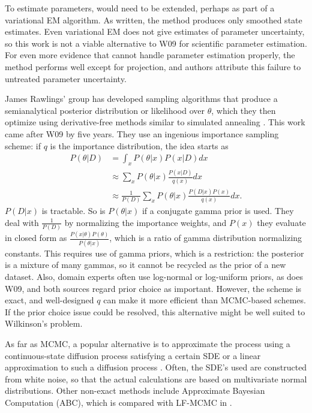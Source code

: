 \documentclass{article}
\begin{document}
To estimate parameters, \cite{opper2008variational} would need to be extended, perhaps as part of a variational EM algorithm. As written, the method produces only smoothed state estimates. Even variational EM does not give estimates of parameter uncertainty, so this work is not a viable alternative to W09 for scientific parameter estimation. For even more evidence that \cite{opper2008variational} cannot handle parameter estimation properly, the method performs well except for projection, and authors attribute this failure to untreated parameter uncertainty. 

James Rawlings' group has developed sampling algorithms that produce a semianalytical posterior distribution or likelihood over $\theta$, which they then optimize using derivative-free methods similar to simulated annealing \cite{gupta2014comparison,srivastava_rawlings2014stoch_opt}.   This work came after W09 by five years. They use an ingenious importance sampling scheme: if $q$ is the importance distribution, the idea starts as
\begin{align*}
P(\theta|D) &= \int_x P(\theta|x)P(x|D) dx\\
&\approx \sum_x P(\theta|x)\frac{P(x|D)}{q(x)} dx\\
&\approx \frac{1}{P(D)}\sum_x P(\theta|x)\frac{P(D|x)P(x)}{q(x)} dx.
\end{align*}
$P(D|x)$ is tractable. So is $P(\theta|x)$ if a conjugate gamma prior is used. They deal with $\frac{1}{P(D)}$ by normalizing the importance weights, and $P(x)$ they evaluate in closed form as $\frac{P(x|\theta)P(\theta)}{P(\theta|x)}$, which is a ratio of gamma distribution normalizing constants. This requires use of gamma priors, which is a restriction: the posterior is a mixture of many gammas, so it cannot be recycled as the prior of a new dataset. Also, domain experts 
often use log-normal or log-uniform priors, as does W09, and both sources regard prior choice as important. However, the scheme is exact, and well-designed $q$ can make it more efficient than MCMC-based schemes. If the prior choice issue could be resolved, this alternative might be well suited to Wilkinson's problem. 

As far as MCMC, a popular alternative is to approximate the process using a continuous-state diffusion process satisfying a certain SDE \cite{golightly2005bayesian,bayes_stoch_mod} or a linear approximation to such a diffusion process \cite{fearnhead2014inference}. Often, the SDE's used are constructed from white noise, so that the actual calculations are based on multivariate normal distributions. Other non-exact methods include Approximate Bayesian Computation (ABC), which is compared with LF-MCMC in \cite{owen2014ABC_LF-MCMCcomparison}. 
\end{document}
